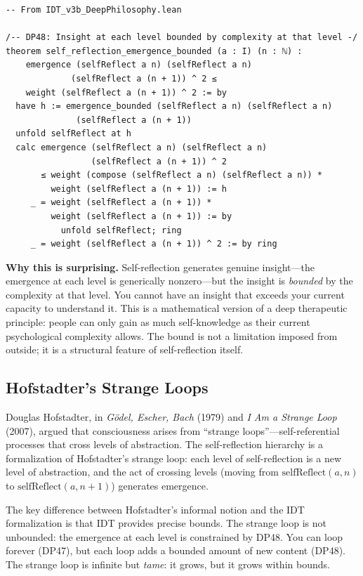 \begin{lstlisting}
-- From IDT_v3b_DeepPhilosophy.lean

/-- DP48: Insight at each level bounded by complexity at that level -/
theorem self_reflection_emergence_bounded (a : I) (n : ℕ) :
    emergence (selfReflect a n) (selfReflect a n)
             (selfReflect a (n + 1)) ^ 2 ≤
    weight (selfReflect a (n + 1)) ^ 2 := by
  have h := emergence_bounded (selfReflect a n) (selfReflect a n)
              (selfReflect a (n + 1))
  unfold selfReflect at h
  calc emergence (selfReflect a n) (selfReflect a n)
                 (selfReflect a (n + 1)) ^ 2
       ≤ weight (compose (selfReflect a n) (selfReflect a n)) *
         weight (selfReflect a (n + 1)) := h
     _ = weight (selfReflect a (n + 1)) *
         weight (selfReflect a (n + 1)) := by
           unfold selfReflect; ring
     _ = weight (selfReflect a (n + 1)) ^ 2 := by ring
\end{lstlisting}

\begin{surprisebox}
\noindent\textbf{Why this is surprising.}
Self-reflection generates genuine insight---the emergence at each level is
generically nonzero---but the insight is \emph{bounded} by the complexity at
that level.  You cannot have an insight that exceeds your current capacity to
understand it.  This is a mathematical version of a deep therapeutic
principle: people can only gain as much self-knowledge as their current
psychological complexity allows.  The bound is not a limitation imposed from
outside; it is a structural feature of self-reflection itself.
\end{surprisebox}

\subsection{Hofstadter's Strange Loops}

Douglas Hofstadter, in \textit{G\"odel, Escher, Bach} (1979) and \textit{I Am
a Strange Loop} (2007), argued that consciousness arises from ``strange
loops''---self-referential processes that cross levels of abstraction.  The
self-reflection hierarchy is a formalization of Hofstadter's strange loop:
each level of self-reflection is a new level of abstraction, and the act of
crossing levels (moving from $\mathrm{selfReflect}(a, n)$ to
$\mathrm{selfReflect}(a, n+1)$) generates emergence.

The key difference between Hofstadter's informal notion and the IDT
formalization is that IDT provides precise bounds.  The strange loop is not
unbounded: the emergence at each level is constrained by DP48.  You can loop
forever (DP47), but each loop adds a bounded amount of new content (DP48).
The strange loop is infinite but \emph{tame}: it grows, but it grows within
bounds.

